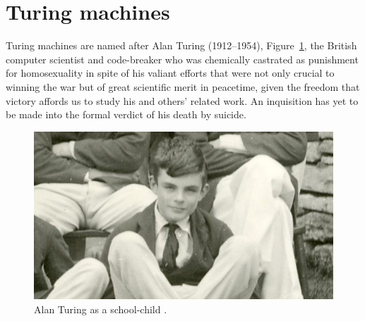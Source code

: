 \documentclass[letterpaper]{article}
\begin{document}
\section{Turing machines}
Turing machines are named after Alan Turing (1912--1954), Figure~\ref{turing}, the British computer scientist and code-breaker who was chemically castrated as punishment for homosexuality in spite of his valiant efforts that were not only crucial to winning the war but of great scientific merit in peacetime, given the freedom that victory affords us to study his and others' related work.  An inquisition has yet to be made into the formal verdict of his death by suicide.
\begin{figure}
	\centering
	\includegraphics[width=1\textwidth]{images/alan-turing-school-photo.jpg}
	\caption[Alan Turing]{Alan Turing as a school-child \cite{hodges2017}.}
	\label{turing}
\end{figure}
\end{document}
